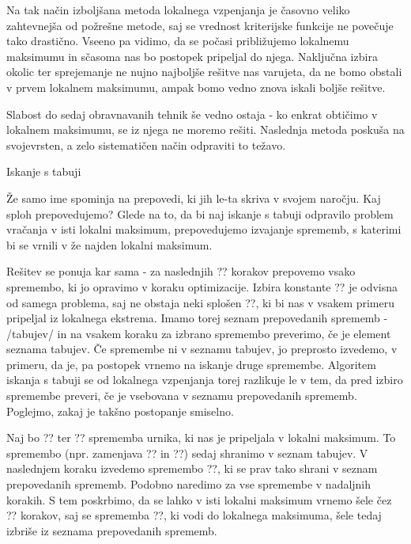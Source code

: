 \documentclass[a4paper]{article}
\begin{document}
Na tak način izboljšana metoda lokalnega vzpenjanja je časovno veliko zahtevnejša od
požrešne metode, saj se vrednost kriterijske funkcije ne povečuje tako drastično. Vseeno
pa vidimo, da se počasi približujemo lokalnemu maksimumu in sčasoma nas bo postopek
pripeljal do njega. Naključna izbira okolic ter sprejemanje ne nujno najboljše rešitve
nas varujeta, da ne bomo obstali v prvem lokalnem maksimumu, ampak bomo vedno znova
iskali boljše rešitve.

Slabost do sedaj obravnavanih tehnik še vedno ostaja - ko enkrat obtičimo v lokalnem
maksimumu, se iz njega ne moremo rešiti. Naslednja metoda poskuša na svojevrsten, a zelo
sistematičen način odpraviti to težavo.

Iskanje s tabuji %

Že samo ime spominja na prepovedi, ki jih le-ta skriva v svojem naročju. Kaj sploh prepovedujemo?
Glede na to, da bi naj iskanje s tabuji odpravilo problem vračanja v isti lokalni maksimum,
prepovedujemo izvajanje sprememb, s katerimi bi se vrnili v že najden lokalni maksimum.

Rešitev se ponuja kar sama - za naslednjih ?? korakov prepovemo vsako spremembo, ki jo
opravimo v koraku optimizacije. Izbira konstante ?? je odvisna od samega problema, saj
ne obstaja neki splošen ??, ki bi nas v vsakem primeru pripeljal iz lokalnega ekstrema.
Imamo torej seznam prepovedanih sprememb - /tabujev/ in na vsakem koraku za izbrano
spremembo preverimo, če je element seznama tabujev. Če spremembe ni v seznamu tabujev, jo
preprosto izvedemo, v primeru, da je, pa postopek vrnemo na iskanje druge spremembe.
Algoritem iskanja s tabuji se od lokalnega vzpenjanja torej razlikuje le v tem, da pred
izbiro spremembe preveri, če je vsebovana v seznamu prepovedanih sprememb. Poglejmo, zakaj
je takšno postopanje smiselno.

Naj bo ?? ter ?? sprememba urnika, ki nas je pripeljala v lokalni maksimum. To
spremembo (npr. zamenjava ?? in ??) sedaj shranimo v
seznam tabujev. V naslednjem koraku izvedemo spremembo ??, ki se prav tako shrani v
seznam prepovedanih sprememb. Podobno naredimo za vse spremembe v nadaljnih korakih. S
tem poskrbimo, da se lahko v isti lokalni maksimum vrnemo šele čez ?? korakov, saj
se sprememba ??, ki vodi do lokalnega maksimuma, šele tedaj izbriše iz seznama
prepovedanih sprememb.
\end{document}
